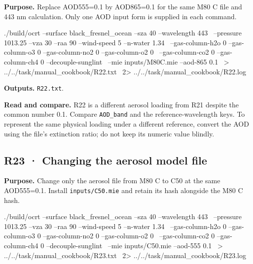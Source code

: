 \label{recipe:R22}

\textbf{Purpose. }Replace AOD555=0.1 by AOD865=0.1 for the same M80 C file and 443 nm calculation. Only one AOD input form is supplied in each command.

\noindent\begin{minipage}{\linewidth}
\begin{ManualCode}

./build/ocrt --surface black_fresnel_ocean --sza 40 --wavelength 443 \
  --pressure 1013.25 --vza 30 --raa 90 --wind-speed 5 --n-water 1.34 \
  --gas-column-h2o 0 --gas-column-o3 0 --gas-column-no2 0 --gas-column-o2 0 \
  --gas-column-co2 0 --gas-column-ch4 0 --decouple-sunglint \
  --mie inputs/M80C.mie --aod-865 0.1 \
  > ../../task/manual_cookbook/R22.txt \
  2> ../../task/manual_cookbook/R22.log

\end{ManualCode}
\end{minipage}\par

\textbf{Outputs. }\texttt{R22.txt}.

\textbf{Read and compare. }R22 is a different aerosol loading from R21 despite the common number 0.1. Compare \texttt{AOD\_\allowbreak{}band} and the reference-wavelength keys. To represent the same physical loading under a different reference, convert the AOD using the file's extinction ratio; do not keep its numeric value blindly.


\subsection{R23 · Changing the aerosol model file}
\label{sec:auto:09_cookbook:5.3}

\label{recipe:R23}

\textbf{Purpose. }Change only the aerosol file from M80 C to C50 at the same AOD555=0.1. Install \texttt{inputs/\allowbreak{}C50.mie} and retain its hash alongside the M80 C hash.

\noindent\begin{minipage}{\linewidth}
\begin{ManualCode}

./build/ocrt --surface black_fresnel_ocean --sza 40 --wavelength 443 \
  --pressure 1013.25 --vza 30 --raa 90 --wind-speed 5 --n-water 1.34 \
  --gas-column-h2o 0 --gas-column-o3 0 --gas-column-no2 0 --gas-column-o2 0 \
  --gas-column-co2 0 --gas-column-ch4 0 --decouple-sunglint \
  --mie inputs/C50.mie --aod-555 0.1 \
  > ../../task/manual_cookbook/R23.txt \
  2> ../../task/manual_cookbook/R23.log

\end{ManualCode}
\end{minipage}\par

